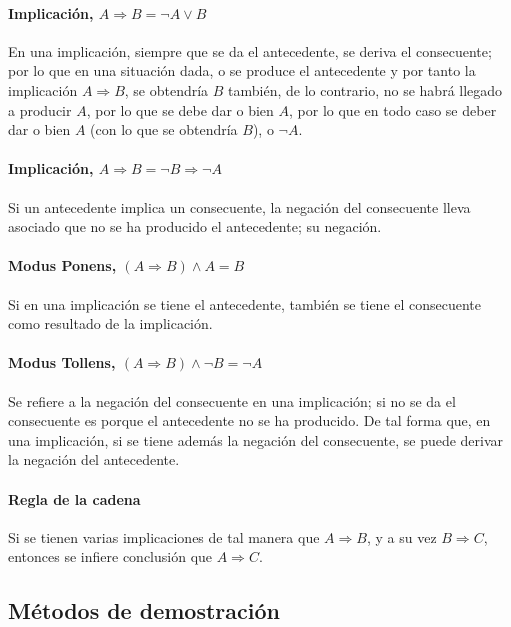 \documentclass[a4paper, 11pt, titlepage]{article}
\begin{document}
            \paragraph{Implicación, $A \Rightarrow B = \neg A \lor B$} En una implicación, 
            siempre que se da el antecedente, se deriva el consecuente; por lo que en una 
            situación dada, o se produce el antecedente y por tanto la implicación $A \Rightarrow B$,
            se obtendría $B$ también, de lo contrario, no se habrá llegado a producir $A$, por lo 
            que se debe dar o bien $A$, por lo que en todo caso se deber dar o bien $A$ 
            (con lo que se obtendría $B$), o $\neg A$.

            \paragraph{Implicación, $A \Rightarrow B = \neg B \Rightarrow \neg A$} Si un antecedente 
            implica un consecuente, la negación del consecuente lleva asociado que no se ha producido 
            el antecedente; su negación.

            \paragraph{Modus Ponens, $(A \Rightarrow B) \land A = B$} Si en una implicación se tiene el 
            antecedente, también se tiene el consecuente como resultado de la implicación. 

            \paragraph{Modus Tollens, $(A \Rightarrow B) \land \neg B = \neg A$} Se refiere a la negación 
            del consecuente en una implicación; si no se da el consecuente es porque el antecedente 
            no se ha producido. De tal forma que, en una implicación, si se tiene además la negación 
            del consecuente, se puede derivar la negación del antecedente.

            \paragraph{Regla de la cadena} Si se tienen varias implicaciones de tal manera que $A \Rightarrow B$, 
            y a su vez $B \Rightarrow C$, entonces se infiere conclusión que $A \Rightarrow C$.

    \subsection{Métodos de demostración}
\end{document}
